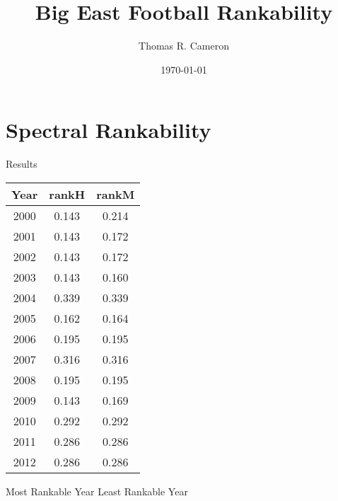 \documentclass{beamer}
\title{Big East Football Rankability}
\author{Thomas R. Cameron}
\institute{Davidson College}
\date{\today}
\begin{document}
\begin{frame}
	\titlepage
\end{frame}


\section{Spectral Rankability}

\begin{frame}{Results}
\begin{minipage}{0.6\textwidth}
\centering
\begin{tabular}{|| c | c | c ||}
\hline
Year & rankH & rankM \\
\hline\hline
2000 & 0.143 & 0.214 \\
\hline
2001 & 0.143 & 0.172 \\
\hline
2002 & 0.143 & 0.172 \\
\hline
\rowcolor{secondary}
2003 & 0.143 & 0.160 \\
\hline
\rowcolor{text}
2004 & 0.339 & 0.339 \\
\hline
2005 & 0.162 & 0.164 \\
\hline
2006 & 0.195 & 0.195 \\
\hline
2007 & 0.316 & 0.316 \\
\hline
2008 & 0.195 & 0.195 \\
\hline
2009 & 0.143 & 0.169 \\
\hline
2010 & 0.292 & 0.292 \\
\hline
2011 & 0.286 & 0.286 \\
\hline
2012 & 0.286 & 0.286 \\
\hline
\end{tabular}
\end{minipage}\hfill
\begin{minipage}{0.4\textwidth}
\quad Most Rankable Year
\quad Least Rankable Year
\end{minipage}
\end{frame}
\end{document}
